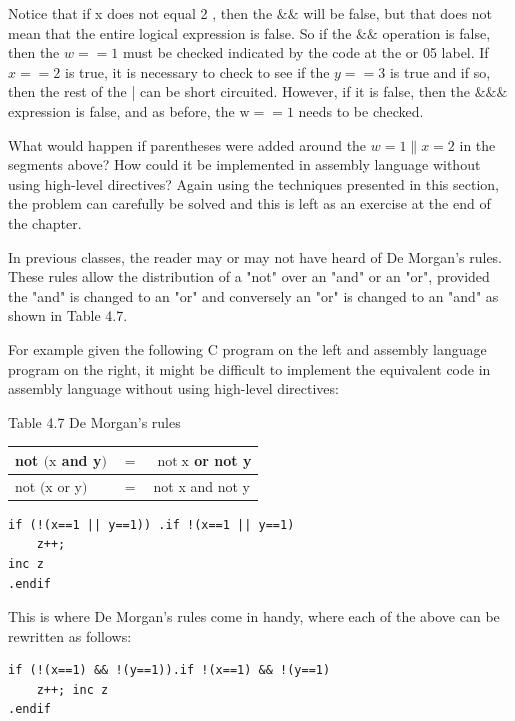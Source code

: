 \documentclass[10pt]{article}
\begin{document}
Notice that if x does not equal 2 , then the $\& \&$ will be false, but that does not mean that the entire logical expression is false. So if the $\& \&$ operation is false, then the $w==1$ must be checked indicated by the code at the or 05 label. If $x==2$ is true, it is necessary to check to see if the $y==3$ is true and if so, then the rest of the | can be short circuited. However, if it is false, then the $\& \& \&$ expression is false, and as before, the $\mathrm{w}==1$ needs to be checked.

What would happen if parentheses were added around the $w=1 \| x=2$ in the segments above? How could it be implemented in assembly language without using high-level directives? Again using the techniques presented in this section, the problem can carefully be solved and this is left as an exercise at the end of the chapter.

In previous classes, the reader may or may not have heard of De Morgan's rules. These rules allow the distribution of a "not" over an "and" or an "or", provided the "and" is changed to an "or" and conversely an "or" is changed to an "and" as shown in Table 4.7.

For example given the following C program on the left and assembly language program on the right, it might be difficult to implement the equivalent code in assembly language without using high-level directives:

Table 4.7 De Morgan's rules

\begin{center}
\begin{tabular}{l|l|l|}
\hline
not $(\mathrm{x}$ and y$)$ & $=$ & $\operatorname{not} \mathrm{x}$ or not y \\
\hline
not $(\mathrm{x}$ or y$)$ & $=$ & not x and not y \\
\hline
\end{tabular}
\end{center}

\begin{verbatim}
if (!(x==1 || y==1)) .if !(x==1 || y==1)
    z++;
inc z
.endif
\end{verbatim}

This is where De Morgan's rules come in handy, where each of the above can be rewritten as follows:

\begin{verbatim}
if (!(x==1) && !(y==1)).if !(x==1) && !(y==1)
    z++; inc z
.endif
\end{verbatim}
\end{document}
